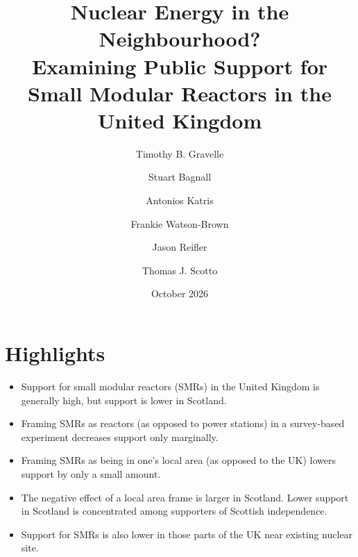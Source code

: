 \documentclass[a4paper, 11pt]{article}
\date{October 2026}
\author[1]{Timothy B. Gravelle}
\author[2]{Stuart Bagnall}
\author[2]{Antonios Katris}
\author[2]{Frankie Watson-Brown}
\author[3]{Jason Reifler}
\author[2]{Thomas J. Scotto}
\affil[1]{Wilfrid Laurier University}
\affil[2]{University of Strathclyde}
\affil[3]{University of Southampton}
\title{Nuclear Energy in the Neighbourhood?\\Examining Public Support for Small Modular Reactors in the United Kingdom}
\begin{document}
\thispagestyle{empty}
\clearpage

\section*{Highlights}
\doublespacing

\begin{itemize}
  \item Support for small modular reactors (SMRs) in the United Kingdom is generally high, but support is lower in Scotland.
  \item Framing SMRs as reactors (as opposed to power stations) in a survey-based experiment decreases support only marginally.
  \item Framing SMRs as being in one's local area (as opposed to the UK) lowers support by only a small amount.
  \item The negative effect of a local area frame is larger in Scotland. Lower support in Scotland is concentrated among supporters of Scottish independence.
  \item Support for SMRs is also lower in those parts of the UK near existing nuclear site.
\end{itemize}
\end{document}

